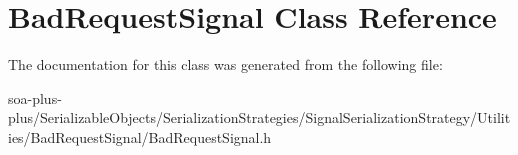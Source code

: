 \hypertarget{class_bad_request_signal}{
\section{BadRequestSignal Class Reference}
\label{class_bad_request_signal}
}


The documentation for this class was generated from the following file:\begin{DoxyCompactItemize}
\item 
soa-\/plus-\/plus/SerializableObjects/SerializationStrategies/SignalSerializationStrategy/Utilities/BadRequestSignal/BadRequestSignal.h\end{DoxyCompactItemize}
